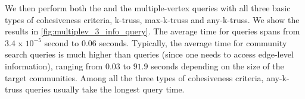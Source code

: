 We then perform both the \toplevelprob{} and the \bottomlevelprob{} multiple-vertex queries with all three basic types of cohesiveness criteria, \ie k-truss, max-k-truss and any-k-truss. We show the results in \autoref{fig:multiplev_3_info_query}. The average time for \toplevelprob{} queries spans from $3.4$ x $10^{-5}$ second to $0.06$ seconds. Typically, the average time for community search queries is much higher than \toplevelprob{} queries (since one needs to access edge-level information), ranging from $0.03$ to $91.9$ seconds depending on the size of the target communities. Among all the three types of cohesiveness criteria, any-k-truss \bottomlevelprob{} queries usually take the longest query time. %

